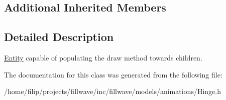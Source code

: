 \subsection*{Additional Inherited Members}


\subsection{Detailed Description}
\hyperlink{classflw_1_1flf_1_1Entity}{Entity} capable of populating the draw method towards children. 

The documentation for this class was generated from the following file\+:\begin{DoxyCompactItemize}
\item 
/home/filip/projects/fillwave/inc/fillwave/models/animations/Hinge.\+h\end{DoxyCompactItemize}
